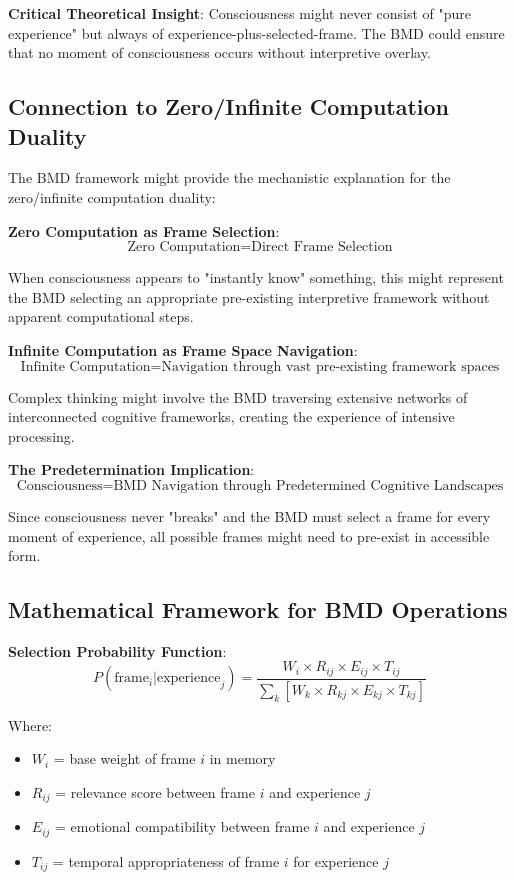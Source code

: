 \documentclass[12pt]{article}
\begin{document}
\textbf{Critical Theoretical Insight}: Consciousness might never consist of "pure experience" but always of experience-plus-selected-frame. The BMD could ensure that no moment of consciousness occurs without interpretive overlay.

\subsection{Connection to Zero/Infinite Computation Duality}

The BMD framework might provide the mechanistic explanation for the zero/infinite computation duality:

\textbf{Zero Computation as Frame Selection}:
$$\text{Zero Computation} = \text{Direct Frame Selection}$$

When consciousness appears to "instantly know" something, this might represent the BMD selecting an appropriate pre-existing interpretive framework without apparent computational steps.

\textbf{Infinite Computation as Frame Space Navigation}:
$$\text{Infinite Computation} = \text{Navigation through vast pre-existing framework spaces}$$

Complex thinking might involve the BMD traversing extensive networks of interconnected cognitive frameworks, creating the experience of intensive processing.

\textbf{The Predetermination Implication}:
$$\text{Consciousness} = \text{BMD Navigation through Predetermined Cognitive Landscapes}$$

Since consciousness never "breaks" and the BMD must select a frame for every moment of experience, all possible frames might need to pre-exist in accessible form.

\subsection{Mathematical Framework for BMD Operations}

\textbf{Selection Probability Function}:
$$P(\text{frame}_i | \text{experience}_j) = \frac{W_i \times R_{ij} \times E_{ij} \times T_{ij}}{\sum_k[W_k \times R_{kj} \times E_{kj} \times T_{kj}]}$$

Where:
\begin{itemize}
\item $W_i$ = base weight of frame $i$ in memory
\item $R_{ij}$ = relevance score between frame $i$ and experience $j$
\item $E_{ij}$ = emotional compatibility between frame $i$ and experience $j$
\item $T_{ij}$ = temporal appropriateness of frame $i$ for experience $j$
\end{itemize}
\end{document}
